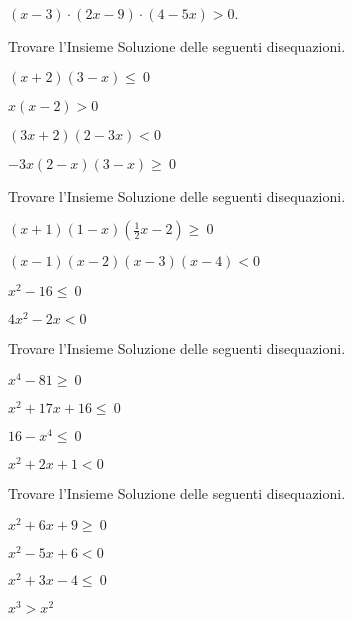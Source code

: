 \begin{esercizio}
 \label{ese:21.43}
 $(x-3)\cdot (2x-9)\cdot (4-5x)>0.$
\end{esercizio}

\begin{esercizio}[\Ast]
 \label{ese:21.44}
Trovare l'Insieme Soluzione delle seguenti disequazioni.
\begin{multicols}{2}
 \begin{enumeratea}
 \item $(x+2)(3-x)\le~0$
\item $x(x-2)>0$
\item $(3x+2)(2-3x)<0$
\item $-3x(2-x)(3-x)\ge~0$
\end{enumeratea}
\end{multicols}
\end{esercizio}
\newpage
\begin{esercizio}[\Ast]
 \label{ese:21.45}
Trovare l'Insieme Soluzione delle seguenti disequazioni.
\begin{multicols}{2}
 \begin{enumeratea}
 \item $(x+1)(1-x)\left(\frac{1}{2}x-2\right)\ge~0$
\item $(x-1)(x-2)(x-3)(x-4)<0$
\item $x^{2}-16\le~0$
\item $4x^{2}-2x<0$
\end{enumeratea}
\end{multicols}
\end{esercizio}

\begin{esercizio}[\Ast]
 \label{ese:21.46}
Trovare l'Insieme Soluzione delle seguenti disequazioni.
\begin{multicols}{2}
 \begin{enumeratea}
 \item $x^{4}-81\ge~0$
\item $x^{2}+17x+16\le~0$
\item $16-x^{4}\le~0$
\item $x^{2}+2x+1<0$
\end{enumeratea}
\end{multicols}
\end{esercizio}

\begin{esercizio}[\Ast]
 \label{ese:21.47}
Trovare l'Insieme Soluzione delle seguenti disequazioni.
\begin{multicols}{2}
 \begin{enumeratea}
 \item $x^{2}+6x+9\ge~0$
\item $x^{2}-5x+6<0$
\item $x^{2}+3x-4\le~0$
\item $x^{3}>x^{2}$
\end{enumeratea}
\end{multicols}
\end{esercizio}

